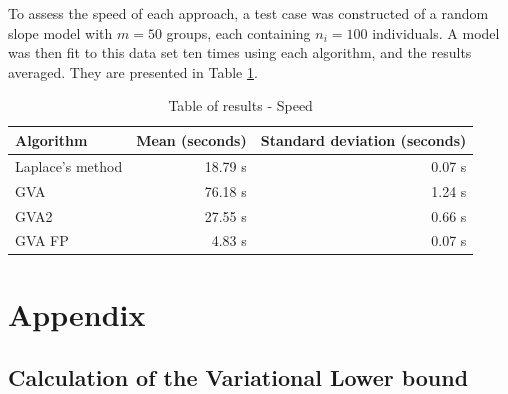 \documentclass{article}[12pt]
\begin{document}




To assess the speed of each approach, a test case was constructed of a random slope model with $m=50$ groups,
each containing $n_i = 100$ individuals. A model was then fit to this data set ten times using each algorithm,
and the results averaged. They are presented in Table \ref{tab:application_slope_speed}.

\begin{table}
\caption{Table of results - Speed}
\label{tab:application_slope_speed}
\begin{tabular}{|l|rr|}
\hline
Algorithm & Mean (seconds) & Standard deviation (seconds) \\
\hline
Laplace's method & 18.79 s & 0.07 s \\
GVA & 76.18 s & 1.24 s \\
GVA2 & 27.55 s & 0.66 s \\
GVA FP & 4.83 s & 0.07 s \\
\hline
\end{tabular}
\end{table}

\newpage
\section{Appendix} 
\subsection{Calculation of the Variational Lower bound}
\end{document}
